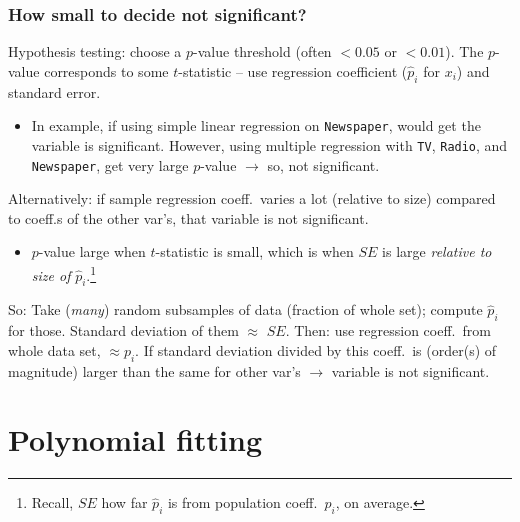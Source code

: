 \documentclass{beamer}
\theoremstyle{example}
\newcommand{\ttt}[1]{{\small\texttt{#1}}}
\begin{document}
\begin{frame}
    \frametitle{How small to decide not significant?}
    
    \pause 
    Hypothesis testing: choose a $p$-value threshold (often $<0.05$ or $<0.01$). The $p$-value corresponds to some $t$-statistic {--} use regression coefficient ($\hat{p}_i$ for $x_i$) and standard error.
    \begin{itemize}
        \item In example, if using simple linear regression on \ttt{Newspaper}, would get the variable is significant. However, using multiple regression with \ttt{TV}, \ttt{Radio}, and \ttt{Newspaper}, get very large $p$-value $\to$ so, not significant.
    \end{itemize}

    \pause 
    Alternatively: if sample regression coeff.\ varies a lot (relative to size) compared to coeff.s of the other var's, that variable is not significant.  
    \begin{itemize}
        \item $p$-value large when $t$-statistic is small, which is when $SE$ is large \emph{relative to size of }$\hat{p}_i$.\qquad\footnote{Recall, $SE$ how far $\hat{p}_i$ is from population coeff.\ $p_i$, on average.}
    \end{itemize}
    \pause 
    So: Take (\emph{many}) random subsamples of data (fraction of whole set); compute $\hat{p}_i$ for those. Standard deviation of them $\approx$ $SE$. \newline 
    \pause
    Then: use regression coeff.\ from whole data set, $\approx p_i$. If standard deviation divided by this coeff.\ is (order(s) of magnitude) larger than the same for other var's $\to$ variable is not significant.
\end{frame}

\section{Polynomial fitting}
\end{document}
